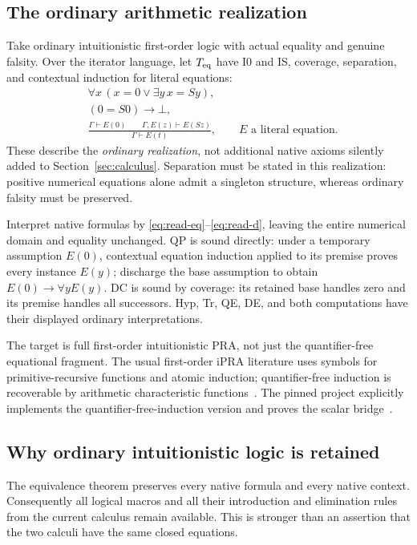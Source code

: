 \documentclass[11pt]{article}
\theoremstyle{definition}
\newcommand{\Teq}{T_{\rm eq}}
\begin{document}
\subsection{The ordinary arithmetic realization}

Take ordinary intuitionistic first-order logic with actual equality and
genuine falsity. Over the iterator language, let $\Teq$ have I0 and IS,
coverage, separation, and contextual induction for literal equations:
\begin{align}
 &\forall x\,(x=0\vee\exists y\,x=Sy),\label{eq:cover}\\
 &(0=S0)\to\bot,\label{eq:sep}\\
 &\frac{\Gamma\vdash E(0)\qquad\Gamma,E(z)\vdash E(Sz)}
        {\Gamma\vdash E(t)},\qquad E\text{ a literal equation}.
        \label{eq:eqind}
\end{align}
These describe the \emph{ordinary realization}, not additional native
axioms silently added to Section~\ref{sec:calculus}. Separation must be
stated in this realization: positive numerical equations alone admit a
singleton structure, whereas ordinary falsity must be preserved.

Interpret native formulas by \eqref{eq:read-eq}--\eqref{eq:read-d}, leaving
the entire numerical domain and equality unchanged. QP is sound directly:
under a temporary assumption $E(0)$, contextual equation induction applied
to its premise proves every instance $E(y)$; discharge the base assumption
to obtain $E(0)\to\forall y E(y)$. DC is sound by coverage: its retained
base handles zero and its premise handles all successors. Hyp, Tr, QE, DE,
and both computations have their displayed ordinary interpretations.

The target is full first-order intuitionistic PRA, not just the
quantifier-free equational fragment. The usual first-order iPRA literature
uses symbols for primitive-recursive functions and atomic induction;
quantifier-free induction is recoverable by arithmetic characteristic
functions~\cite{salehi}. The pinned project explicitly implements the
quantifier-free-induction version and proves the scalar bridge~\cite{biinterp}.

\subsection{Why ordinary intuitionistic logic is retained}

The equivalence theorem preserves every native formula and every native
context. Consequently all logical macros and all their introduction and
elimination rules from the current calculus remain available. This is
stronger than an assertion that the two calculi have the same closed
equations.
\end{document}

